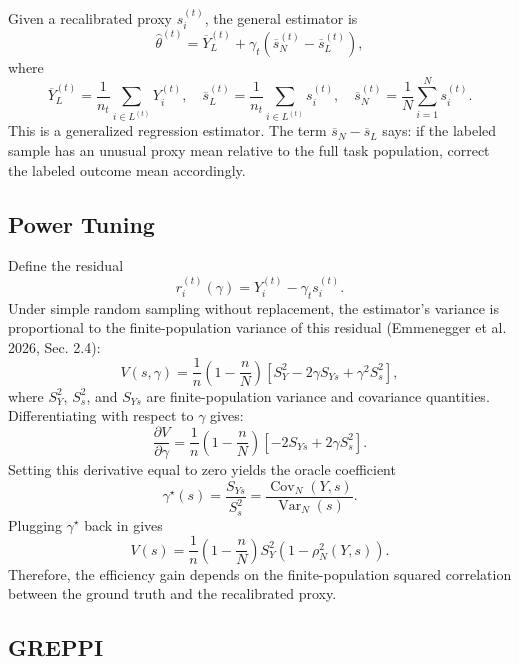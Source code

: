 \documentclass[11pt]{article}
\newcommand{\Var}{\operatorname{Var}}
\newcommand{\Cov}{\operatorname{Cov}}
\begin{document}
Given a recalibrated proxy $s_i^{(t)}$, the general estimator is
\[
  \widehat\theta^{(t)}
  =
  \overline Y_{L}^{(t)}
  +
  \gamma_t
  \left(
    \overline s_{N}^{(t)}
    -
    \overline s_{L}^{(t)}
  \right),
\]
where
\[
  \overline Y_L^{(t)}=\frac{1}{n_t}\sum_{i\in L^{(t)}}Y_i^{(t)},
  \quad
  \overline s_L^{(t)}=\frac{1}{n_t}\sum_{i\in L^{(t)}}s_i^{(t)},
  \quad
  \overline s_N^{(t)}=\frac{1}{N}\sum_{i=1}^N s_i^{(t)}.
\]
This is a generalized regression estimator. The term $\overline s_N-\overline s_L$ says: if the labeled sample has an unusual proxy mean relative to the full task population, correct the labeled outcome mean accordingly.

\subsection{Power Tuning}

Define the residual
\[
  r_i^{(t)}(\gamma)
  =
  Y_i^{(t)}-\gamma_t s_i^{(t)}.
\]
Under simple random sampling without replacement, the estimator's variance is proportional to the finite-population variance of this residual (Emmenegger et al. 2026, Sec. 2.4):
\[
  V(s,\gamma)
  =
  \frac{1}{n}
  \left(1-\frac{n}{N}\right)
  \left[
    S_Y^2
    -2\gamma S_{Ys}
    +\gamma^2 S_s^2
  \right],
\]
where $S_Y^2$, $S_s^2$, and $S_{Ys}$ are finite-population variance and covariance quantities. Differentiating with respect to $\gamma$ gives:
\[
  \frac{\partial V}{\partial \gamma}
  =
  \frac{1}{n}
  \left(1-\frac{n}{N}\right)
  \left[
    -2S_{Ys}+2\gamma S_s^2
  \right].
\]
Setting this derivative equal to zero yields the oracle coefficient
\[
  \gamma^\star(s)=\frac{S_{Ys}}{S_s^2}
  =
  \frac{\Cov_N(Y,s)}{\Var_N(s)}.
\]
Plugging $\gamma^\star$ back in gives
\[
  V(s)
  =
  \frac{1}{n}
  \left(1-\frac{n}{N}\right)
  S_Y^2
  \left(1-\rho_N^2(Y,s)\right).
\]
Therefore, the efficiency gain depends on the finite-population squared correlation between the ground truth and the recalibrated proxy.

\subsection{GREPPI}
\end{document}
